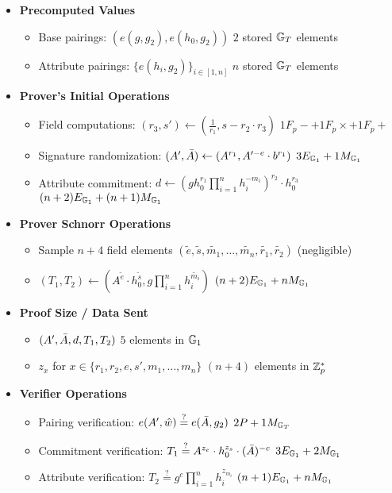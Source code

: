 \begin{itemize}
    \item \textbf{Precomputed Values}
    \begin{itemize}
        \item Base pairings: $(e(g, g_2), e(h_0, g_2))$ \qquad $2$ stored $\mathbb{G}_T$ elements
        \item Attribute pairings: $\{e(h_i, g_2)\}_{i \in [1,n]}$ \qquad $n$ stored $\mathbb{G}_T$ elements
    \end{itemize}

    \item \textbf{Prover's Initial Operations}
    \begin{itemize}
        \item Field computations: $(r_3, s') \gets (\frac{1}{r_1}, s - r_2 \cdot r_3)$ \qquad $1F_p- + 1F_p\times + 1F_p+$
        \item Signature randomization: $(A', \Bar{A}) \gets (A^{r_1}, A'^{-e} \cdot b^{r_1})$ \qquad $3E_{\mathbb{G}_1} + 1M_{\mathbb{G}_1}$
        \item Attribute commitment: $d \gets (gh_0^{r_1}\prod_{i=1}^n h_i^{-m_i})^{r_2} \cdot h_0^{r_3}$ \qquad $(n+2)E_{\mathbb{G}_1} + (n+1)M_{\mathbb{G}_1}$
    \end{itemize}
    
    \item \textbf{Prover Schnorr Operations}
    \begin{itemize}
        \item Sample $n+4$ field elements $(\tilde{e}, \tilde{s}, \tilde{m_1},\ldots,\tilde{m_n}, \tilde{r_1}, \tilde{r_2})$ \qquad (negligible)
        \item $(T_1, T_2) \gets (A^{\tilde{e}} \cdot h_0^{\tilde{s}}, g\prod_{i=1}^n h_i^{\tilde{m_i}})$ \qquad $(n+2)E_{\mathbb{G}_1} + nM_{\mathbb{G}_1}$
    \end{itemize}
    
    \item \textbf{Proof Size / Data Sent}
    \begin{itemize}
        \item $(A', \Bar{A}, d, T_1, T_2)$ \qquad $5$ elements in $\mathbb{G}_1$
        \item $z_x$ for $x \in \{r_1, r_2, e, s', m_1,\ldots,m_n\}$ \qquad $(n+4)$ elements in $\mathbb{Z}_p^*$
    \end{itemize}
    
    \item \textbf{Verifier Operations}
    \begin{itemize}
        \item Pairing verification: $e(A',\hat{w}) \stackrel{?}{=} e(\Bar{A},g_2)$ \qquad $2P + 1M_{\mathbb{G}_T}$
        \item Commitment verification: $T_1 \stackrel{?}{=} A^{z_e} \cdot h_0^{z_s} \cdot (\Bar{A})^{-c}$ \qquad $3E_{\mathbb{G}_1} + 2M_{\mathbb{G}_1}$
        \item Attribute verification: $T_2 \stackrel{?}{=} g^c\prod_{i=1}^n h_i^{z_{m_i}}$ \qquad $(n+1)E_{\mathbb{G}_1} + nM_{\mathbb{G}_1}$
    \end{itemize}
\end{itemize}




